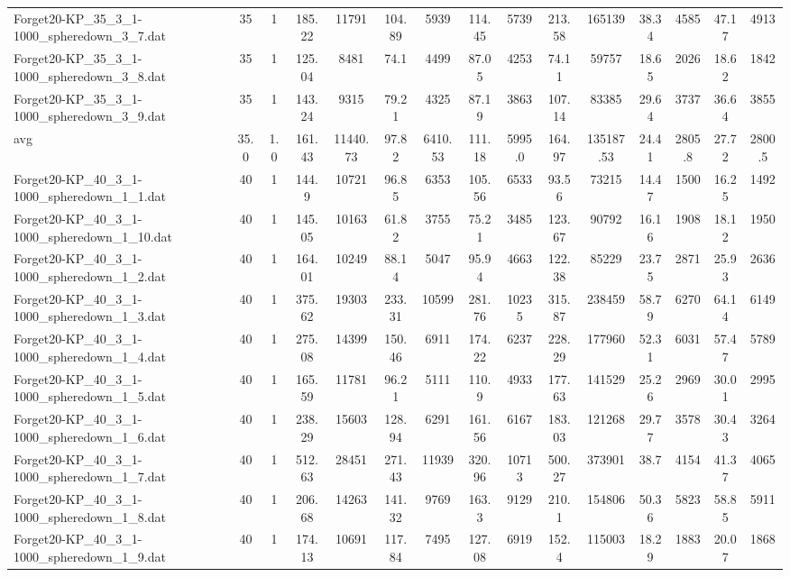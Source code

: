 \begin{table}[!ht]
{\begin{tabular}{lcccccccccccccc}
Forget20-KP\_35\_3\_1-1000\_spheredown\_3\_7.dat & 35 & 1 & 185.22 & 11791 & 104.89 & 5939 & 114.45 & 5739 & 213.58 & 165139 & 38.34 & 4585 & 47.17 & 4913 \\
Forget20-KP\_35\_3\_1-1000\_spheredown\_3\_8.dat & 35 & 1 & 125.04 & 8481 & 74.1 & 4499 & 87.05 & 4253 & 74.11 & 59757 & 18.65 & 2026 & 18.62 & 1842 \\
Forget20-KP\_35\_3\_1-1000\_spheredown\_3\_9.dat & 35 & 1 & 143.24 & 9315 & 79.21 & 4325 & 87.19 & 3863 & 107.14 & 83385 & 29.64 & 3737 & 36.64 & 3855 \\
\hline avg & 35.0 & 1.0 & 161.43& 11440.73 & 97.82& 6410.53 & 111.18& 5995.0 & 164.97& 135187.53 & 24.41& 2805.8 & 27.72& 2800.5\\ \hline
Forget20-KP\_40\_3\_1-1000\_spheredown\_1\_1.dat & 40 & 1 & 144.9 & 10721 & 96.85 & 6353 & 105.56 & 6533 & 93.56 & 73215 & 14.47 & 1500 & 16.25 & 1492 \\
Forget20-KP\_40\_3\_1-1000\_spheredown\_1\_10.dat & 40 & 1 & 145.05 & 10163 & 61.82 & 3755 & 75.21 & 3485 & 123.67 & 90792 & 16.16 & 1908 & 18.12 & 1950 \\
Forget20-KP\_40\_3\_1-1000\_spheredown\_1\_2.dat & 40 & 1 & 164.01 & 10249 & 88.14 & 5047 & 95.94 & 4663 & 122.38 & 85229 & 23.75 & 2871 & 25.93 & 2636 \\
Forget20-KP\_40\_3\_1-1000\_spheredown\_1\_3.dat & 40 & 1 & 375.62 & 19303 & 233.31 & 10599 & 281.76 & 10235 & 315.87 & 238459 & 58.79 & 6270 & 64.14 & 6149 \\
Forget20-KP\_40\_3\_1-1000\_spheredown\_1\_4.dat & 40 & 1 & 275.08 & 14399 & 150.46 & 6911 & 174.22 & 6237 & 228.29 & 177960 & 52.31 & 6031 & 57.47 & 5789 \\
Forget20-KP\_40\_3\_1-1000\_spheredown\_1\_5.dat & 40 & 1 & 165.59 & 11781 & 96.21 & 5111 & 110.9 & 4933 & 177.63 & 141529 & 25.26 & 2969 & 30.01 & 2995 \\
Forget20-KP\_40\_3\_1-1000\_spheredown\_1\_6.dat & 40 & 1 & 238.29 & 15603 & 128.94 & 6291 & 161.56 & 6167 & 183.03 & 121268 & 29.77 & 3578 & 30.43 & 3264 \\
Forget20-KP\_40\_3\_1-1000\_spheredown\_1\_7.dat & 40 & 1 & 512.63 & 28451 & 271.43 & 11939 & 320.96 & 10713 & 500.27 & 373901 & 38.7 & 4154 & 41.37 & 4065 \\
Forget20-KP\_40\_3\_1-1000\_spheredown\_1\_8.dat & 40 & 1 & 206.68 & 14263 & 141.32 & 9769 & 163.3 & 9129 & 210.1 & 154806 & 50.36 & 5823 & 58.85 & 5911 \\
Forget20-KP\_40\_3\_1-1000\_spheredown\_1\_9.dat & 40 & 1 & 174.13 & 10691 & 117.84 & 7495 & 127.08 & 6919 & 152.4 & 115003 & 18.29 & 1883 & 20.07 & 1868 \\

\end{tabular}}
\end{table}
